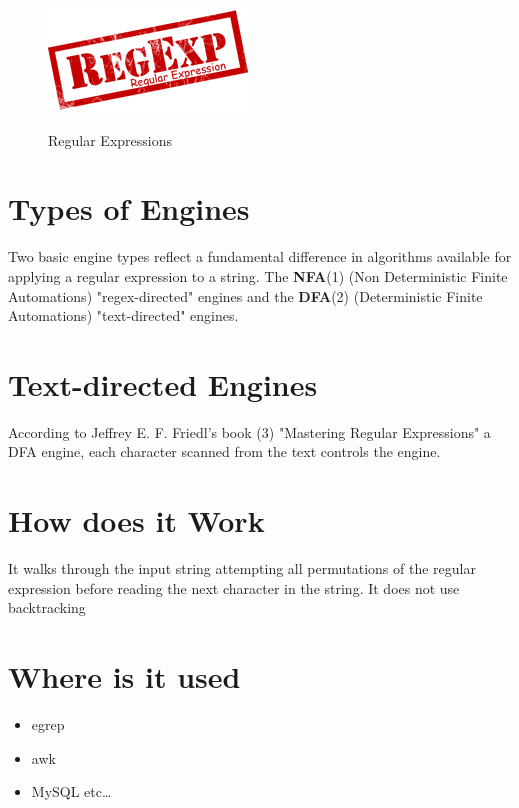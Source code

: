 \documentclass[a4paper,11pt]{report}
\begin{document}
\begin{figure}[h]
	\centering
		\includegraphics{images/regexp_logo.png}~\\[1cm]
		\caption{Regular Expressions}
\end{figure}

\section{Types of Engines}
\begin{flushleft}
Two basic engine types reflect a fundamental difference in algorithms available for applying a regular expression to a string. The \textbf{NFA}{\footnotesize (1)} (Non Deterministic Finite Automations) "regex-directed" engines and the \textbf{DFA}{\footnotesize (2)} (Deterministic Finite Automations) "text-directed" engines.
\end{flushleft}

\section{Text-directed Engines}
\begin{center}
According to Jeffrey E. F. Friedl’s book {\footnotesize (3)} "Mastering Regular Expressions" a DFA engine, each character scanned from the text controls the engine.
\end{center}

\section{How does it Work}
\begin{flushright}
It walks through the input string attempting all permutations of the regular expression before reading the next character in the string. It does not use backtracking
\end{flushright}

\section{Where is it used}
\begin{itemize}
  \item egrep
  \item awk
  \item MySQL etc\ldots
\end{itemize}
\end{document}

